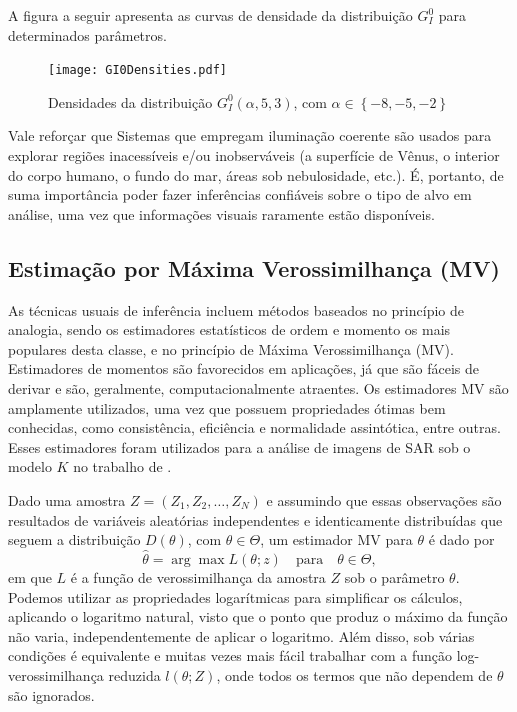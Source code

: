 \documentclass[12pt]{article}
\begin{document}
A figura a seguir apresenta as curvas de densidade da distribuição $G_I^0$ para determinados parâmetros.
\begin{figure}[H]
     \centering
     \texttt{[image: GI0Densities.pdf]}
     \caption{Densidades da distribuição $G_I^0(\alpha, 5, 3)$, com $\alpha \in \left \{  -8, -5, -2 \right \}$}
     \label{graf_1}
\end{figure}

Vale reforçar que Sistemas que empregam iluminação coerente são usados para explorar regiões inacessíveis e/ou inobserváveis (a superfície de Vênus, o interior do corpo humano, o fundo do mar, áreas sob nebulosidade, etc.). É, portanto, de suma importância poder fazer inferências confiáveis sobre o tipo de alvo em análise, uma vez que informações visuais raramente estão disponíveis.


\subsection{Estimação por Máxima Verossimilhança (MV)}

As técnicas usuais de inferência incluem métodos baseados no princípio de analogia, sendo os estimadores estatísticos de ordem e momento os mais populares desta classe, e no princípio de Máxima Verossimilhança (MV). Estimadores de momentos são favorecidos em aplicações, já que são fáceis de derivar e são, geralmente, computacionalmente atraentes. Os estimadores MV são amplamente utilizados, uma vez que possuem propriedades ótimas bem conhecidas, como consistência, eficiência e normalidade assintótica, entre outras. Esses estimadores foram utilizados para a análise de imagens de SAR sob o modelo $K$ no trabalho de \citet{KMaxVer_Joughin}.

Dado uma amostra $Z = (Z_1, Z_2, \dots, Z_N)$ e assumindo que essas observações são resultados de variáveis aleatórias independentes e identicamente distribuídas que seguem a distribuição $D(\theta)$, com $\theta \in \Theta$, um estimador MV para $\theta$ é dado por
\begin{equation}
    \widehat{\theta} = \arg\max L(\theta; z) \quad \text{para} \quad \theta \in \Theta, \label{eq:mv}
\end{equation}
em que $L$ é a função de verossimilhança da amostra $Z$ sob o parâmetro $\theta$. Podemos utilizar as propriedades logarítmicas para simplificar os cálculos, aplicando o logaritmo natural, visto que o ponto que produz o máximo da função não varia, independentemente de aplicar o logaritmo. Além disso, sob várias condições é equivalente e muitas vezes mais fácil trabalhar com a função log-verossimilhança reduzida $l(\theta; Z)$, onde todos os termos que não dependem de $\theta$ são ignorados.
\end{document}
